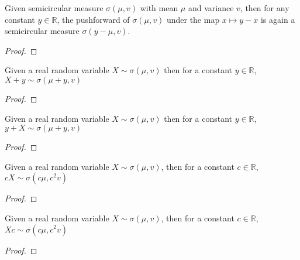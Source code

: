 \begin{lemma}
  \label{lem:semicircleReal_map_const_sub}
  \leanok
   Given semicircular measure $\sigma(\mu, v)$ with mean $\mu$ and variance $v$, then for any constant $y \in \mathbb{R}$, the pushforward
  of $\sigma(\mu, v)$ under the map $x \mapsto y - x$ is again a semicircular measure $\sigma(y - \mu, v)$.
  \begin{proof}

  \end{proof}
\end{lemma}


\begin{lemma}
  \label{lem:semicircleReal_add_const}
  \leanok
  Given a real random variable $X \sim \sigma(\mu, v)$
  then for a constant $y \in \mathbb{R}$, $X + y \sim \sigma(\mu + y, v)$
  \begin{proof}
  \end{proof}
\end{lemma}


\begin{lemma}
  \label{lem:semicircleReal_const_add}
  \leanok
  Given a real random variable $X \sim \sigma(\mu, v)$
  then for a constant $y \in \mathbb{R}$, $y + X \sim \sigma(\mu + y, v)$
  \begin{proof}

  \end{proof}
\end{lemma}


\begin{lemma}
  \label{lem:semicircleReal_const_mul}
  \leanok
  Given a real random variable $X \sim \sigma(\mu, v)$,
  then for a constant $c \in \mathbb{R}$, $cX \sim \sigma(c\mu , c^2v)$
  \begin{proof}

  \end{proof}
\end{lemma}


\begin{lemma}
  \label{lem:semicircleReal_mul_const}
  \leanok
   Given a real random variable $X \sim \sigma(\mu, v)$,
  then for a constant $c \in \mathbb{R}$, $Xc \sim \sigma(c \mu  , c^2v)$
  \begin{proof}

  \end{proof}
\end{lemma}

